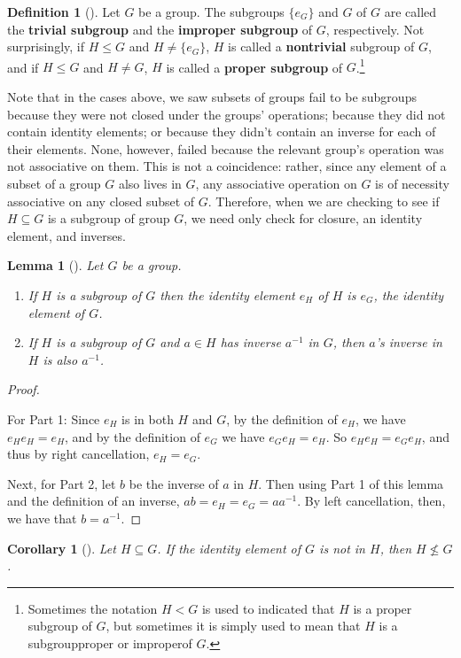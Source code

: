 \documentclass[10pt,]{book}
\newcommand{\terminology}[1]{\textbf{#1}}
\theoremstyle{plain}
\newtheorem{corollary}[theorem]{Corollary}
\newtheorem{lemma}[theorem]{Lemma}
\theoremstyle{definition}
\newtheorem{definition}[theorem]{Definition}
\theoremstyle{definition}
\theoremstyle{definition}
\theoremstyle{definition}
\numberwithin{equation}{section}
\newcommand{\lt}{<}
\begin{document}
\begin{definition}[{}]\label{definition-36}
Let \(G\) be a group. The subgroups \(\{e_G\}\) and \(G\) of \(G\) are called the \terminology{trivial subgroup} and the \terminology{improper subgroup} of \(G\), respectively. Not surprisingly, if \(H\leq G\) and \(H\neq \{e_G\}\), \(H\) is called a \terminology{nontrivial} subgroup of \(G\), and if \(H\leq G\) and \(H\neq G\), \(H\) is called a \terminology{proper subgroup} of \(G\).\footnote{Sometimes the notation \(H\lt G\) is used to indicated that \(H\) is a proper subgroup of \(G\), but sometimes it is simply used to mean that \(H\) is a subgroup\textemdash{}proper or improper\textemdash{}of \(G\).\label{fn-3}}%
\end{definition}
Note that in the cases above, we saw subsets of groups fail to be subgroups because they were not closed under the groups' operations; because they did not contain identity elements; or because they didn't contain an inverse for each of their elements. None, however, failed because the relevant group's operation was not associative on them. This is not a coincidence: rather, since any element of a subset of a group \(G\) also lives in \(G\), any associative operation on \(G\) is of necessity associative on any closed subset of \(G\). Therefore, when we are checking to see if \(H\subseteq G\) is a subgroup of group \(G\), we need only check for closure, an identity element, and inverses.%
\begin{lemma}[{}]\label{subsame}
Let \(G\) be a group. \leavevmode%
\begin{enumerate}
\item\hypertarget{li-187}{}If \(H\) is a subgroup of \(G\) then the identity element \(e_H\) of \(H\) is \(e_G\), the identity element of \(G\).%
\item\hypertarget{li-188}{}If \(H\) is a subgroup of \(G\) and \(a\in H\) has inverse \(a^{-1}\) in \(G\), then \(a\)'s inverse in \(H\) is also \(a^{-1}\).%
\end{enumerate}
%
\end{lemma}
\begin{proof}\hypertarget{proof-18}{}
For Part 1: Since \(e_H\) is in both \(H\) and \(G\), by the definition of \(e_H\), we have \(e_He_H=e_H\), and by the definition of \(e_G\) we have \(e_Ge_H=e_H\). So \(e_He_H=e_Ge_H\), and thus by right cancellation, \(e_H=e_G\).%
\par
Next, for Part 2, let \(b\) be the inverse of \(a\) in \(H\). Then using Part 1 of this lemma and the definition of an inverse, \(ab=e_H=e_G=aa^{-1}\). By left cancellation, then, we have that \(b=a^{-1}\).%
\end{proof}
\begin{corollary}[{}]\label{corollary-2}
Let \(H\subseteq G\). If the identity element of \(G\) is not in \(H\), then \(H\not\leq G\).%
\end{corollary}
\typeout{************************************************}
\typeout{************************************************}
\end{document}
